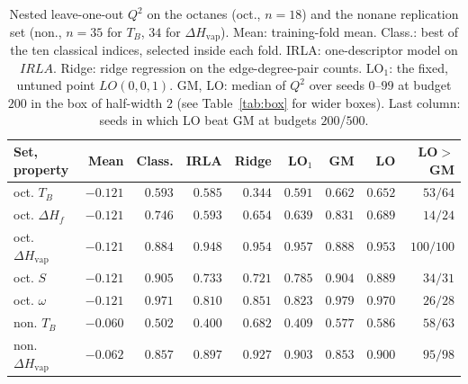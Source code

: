 \documentclass[a5paper, 10pt]{article}
\theoremstyle{plain}
\theoremstyle{remark}
\theoremstyle{definition}
\begin{document}
\begin{table}[htbp]
\centering
\caption{Nested leave-one-out $Q^2$ on the octanes (oct., $n = 18$) and
the nonane replication set (non., $n = 35$ for $T_B$, $34$ for
$\Delta H_{\mathrm{vap}}$). Mean: training-fold mean. Class.: best of the
ten classical indices, selected inside each fold. IRLA: one-descriptor
model on $IRLA$. Ridge: ridge regression on the edge-degree-pair counts.
LO$_1$: the fixed, untuned point $LO(0,0,1)$. GM, LO: median of $Q^2$
over seeds $0$--$99$ at budget $200$ in the box of half-width $2$
(see Table~\ref{tab:box} for wider boxes). Last column: seeds in which
LO beat GM at budgets $200$/$500$.}
\label{tab:external}
\small
\setlength{\tabcolsep}{2pt}
\begin{tabular}{lrrrrrrrr}
\toprule
Set, property & Mean & Class. & IRLA & Ridge & LO$_1$ & GM & LO & LO$>$GM\\
\midrule
oct. $T_B$ & $-0.121$ & $0.593$ & $0.585$ & $0.344$ & $0.591$ & $0.662$ & $0.652$ & $53/64$\\
oct. $\Delta H_f$ & $-0.121$ & $0.746$ & $0.593$ & $0.654$ & $0.639$ & $0.831$ & $0.689$ & $14/24$\\
oct. $\Delta H_{\mathrm{vap}}$ & $-0.121$ & $0.884$ & $0.948$ & $0.954$ & $0.957$ & $0.888$ & $0.953$ & $100/100$\\
oct. $S$ & $-0.121$ & $0.905$ & $0.733$ & $0.721$ & $0.785$ & $0.904$ & $0.889$ & $34/31$\\
oct. $\omega$ & $-0.121$ & $0.971$ & $0.810$ & $0.851$ & $0.823$ & $0.979$ & $0.970$ & $26/28$\\
non. $T_B$ & $-0.060$ & $0.502$ & $0.400$ & $0.682$ & $0.409$ & $0.577$ & $0.586$ & $58/63$\\
non. $\Delta H_{\mathrm{vap}}$ & $-0.062$ & $0.857$ & $0.897$ & $0.927$ & $0.903$ & $0.853$ & $0.900$ & $95/98$\\
\bottomrule
\end{tabular}
\end{table}
\end{document}
